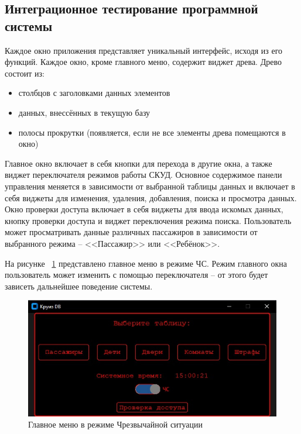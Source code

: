 \subsection{Интеграционное тестирование программной системы}
Каждое окно приложения представляет уникальный интерфейс, исходя из его функций.  Каждое окно, кроме главного меню, содержит виджет древа.
Древо состоит из:
\begin{itemize}
	\item столбцов с заголовками данных элементов
	\item данных, внессённых в текущую базу
	\item полосы прокрутки (появляется, если не все элементы древа помещаются в окно)
\end{itemize}
Главное окно включает в себя кнопки для перехода в другие окна, а также виджет переключателя режимов работы СКУД.
Основное содержимое панели управления меняется в зависимости от выбранной таблицы данных и включает в себя виджеты для изменения, удаления, добавления, поиска и просмотра данных.
Окно проверки доступа включает в себя виджеты для ввода искомых данных, кнопку проверки доступа и виджет переключения режима поиска. Пользователь может просматривать данные различных пассажиров в зависимости от выбранного режима -- <<Пассажир>> или <<Ребёнок>>.

На рисунке ~\ref{fig:example4} представлено главное меню в режиме ЧС.
Режим главного окна пользователь может изменить с помощью переключателя -- от этого будет зависеть дальнейшее поведение системы.
\begin{figure}[ht]
	\centering
	\includegraphics[width=1\linewidth]{images/Example4}
	\caption{Главное меню в режиме Чрезвычайной ситуации}
	\label{fig:example4}
\end{figure}

